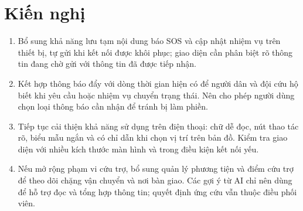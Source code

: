 \documentclass[12pt,a4paper,oneside]{report}
\begin{document}
\section*{Kiến nghị}
\begin{enumerate}
  \item Bổ sung khả năng lưu tạm nội dung báo SOS và cập nhật nhiệm vụ trên thiết bị, tự gửi khi kết nối được khôi phục; giao diện cần phân biệt rõ thông tin đang chờ gửi với thông tin đã được tiếp nhận.
  \item Kết hợp thông báo đẩy với dòng thời gian hiện có để người dân và đội cứu hộ biết khi yêu cầu hoặc nhiệm vụ chuyển trạng thái. Nên cho phép người dùng chọn loại thông báo cần nhận để tránh bị làm phiền.
  \item Tiếp tục cải thiện khả năng sử dụng trên điện thoại: chữ dễ đọc, nút thao tác rõ, biểu mẫu ngắn và có chỉ dẫn khi chọn vị trí trên bản đồ. Kiểm tra giao diện với nhiều kích thước màn hình và trong điều kiện kết nối yếu.
  \item Nếu mở rộng phạm vi cứu trợ, bổ sung quản lý phương tiện và điểm cứu trợ để theo dõi chặng vận chuyển và nơi bàn giao. Các gợi ý từ AI chỉ nên dùng để hỗ trợ đọc và tổng hợp thông tin; quyết định ứng cứu vẫn thuộc điều phối viên.
\end{enumerate}
\end{document}
